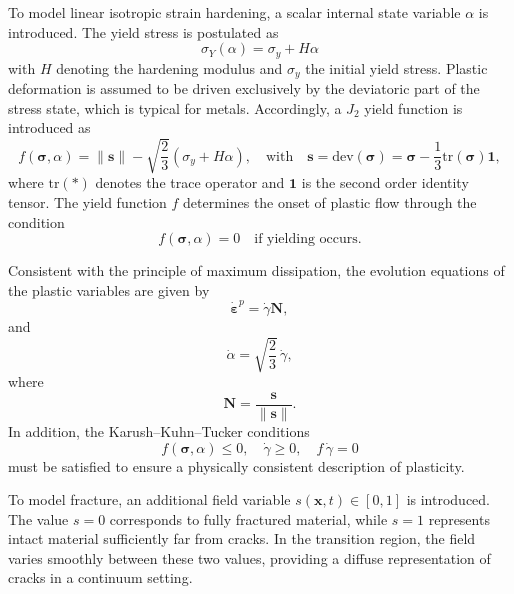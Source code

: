 \documentclass[pdflatex,sn-mathphys-num]{sn-jnl}%
\theoremstyle{thmstyleone}%
\theoremstyle{thmstyletwo}%
\theoremstyle{thmstylethree}%
\begin{document}
To model linear isotropic strain hardening, a scalar internal state variable $\alpha$ is introduced. 
The yield stress is postulated as
\begin{equation}
    \sigma_Y(\alpha) = \sigma_y + H\alpha
\end{equation}
with $H$ denoting the hardening modulus and $\sigma_y$ the initial yield stress. 
Plastic deformation is assumed to be driven exclusively by the deviatoric part of the stress state, which is typical for metals. 
Accordingly, a $J_2$ yield function is introduced as
\begin{equation}
    f(\boldsymbol{\sigma},\alpha) = \|\boldsymbol{s}\| - \sqrt{\dfrac{2}{3}}\left(\sigma_y+H\alpha\right), 
    \quad \text{with} \quad 
    \boldsymbol{s} = \text{dev}\left(\boldsymbol{\sigma}\right) = \boldsymbol{\sigma}-\dfrac{1}{3}\text{tr}\left(\boldsymbol{\sigma}\right)\boldsymbol{1},
\end{equation}
where $\text{tr}(*)$ denotes the trace operator and $\boldsymbol{1}$ is the second order identity tensor.
The yield function $f$ determines the onset of plastic flow through the condition
\begin{equation}
    f(\boldsymbol{\sigma},\alpha) = 0 \quad \text{if yielding occurs}.
\end{equation}

Consistent with the principle of maximum dissipation, the evolution equations of the plastic variables are given by
\begin{equation}
    \dot{\boldsymbol{\varepsilon}}^p = \dot{\gamma}\boldsymbol{N},
    \label{eq:evolution_eps_p}
\end{equation}
and
\begin{equation}
    \dot{\alpha} = \sqrt{\dfrac{2}{3}}\,\dot{\gamma},
    \label{eq:evolution_alpha}
\end{equation}
where
\begin{equation}
    \boldsymbol{N} = \dfrac{\boldsymbol{s}}{\|\boldsymbol{s}\|}.
\end{equation}
In addition, the Karush--Kuhn--Tucker conditions
\begin{equation}
    f(\boldsymbol{\sigma},\alpha) \le 0, 
    \quad \dot{\gamma} \ge 0, 
    \quad f\,\dot{\gamma} = 0
\end{equation}
must be satisfied to ensure a physically consistent description of plasticity.

To model fracture, an additional field variable $s(\boldsymbol{x},t) \in [0,1]$ is introduced. 
The value $s=0$ corresponds to fully fractured material, while $s=1$ represents intact material sufficiently far from cracks. 
In the transition region, the field varies smoothly between these two values, providing a diffuse representation of cracks in a continuum setting.
\end{document}
